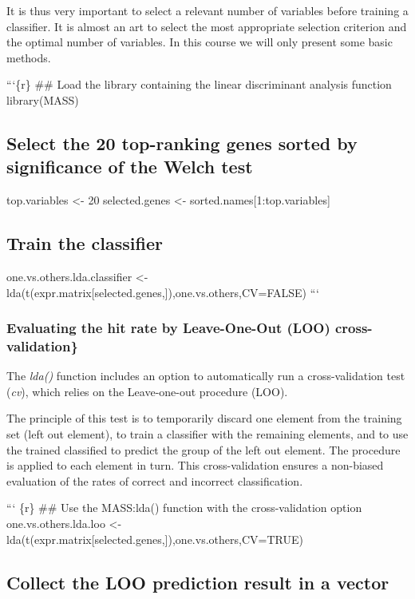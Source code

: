It is thus very important to select a relevant number of variables
before training a classifier. It is almost an art to select the most
appropriate selection criterion and the optimal number of variables. In
this course we will only present some basic methods.

```\{r\} \#\# Load the library containing the linear discriminant
analysis function library(MASS)

\subsection{Select the 20 top-ranking genes sorted by significance of
the Welch
test}\label{select-the-20-top-ranking-genes-sorted-by-significance-of-the-welch-test}

top.variables \textless{}- 20 selected.genes \textless{}-
sorted.names{[}1:top.variables{]}

\subsection{Train the classifier}\label{train-the-classifier}

one.vs.others.lda.classifier \textless{}-
lda(t(expr.matrix{[}selected.genes,{]}),one.vs.others,CV=FALSE) ```

\subsubsection{Evaluating the hit rate by Leave-One-Out (LOO)
cross-validation\}}\label{evaluating-the-hit-rate-by-leave-one-out-loo-cross-validation}

The \emph{lda()} function includes an option to automatically run a
cross-validation test (\emph{cv}), which relies on the {Leave-one-out}
procedure ({LOO}).

The principle of this test is to temporarily discard one element from
the training set ({left out} element), to train a classifier with the
remaining elements, and to use the trained classified to predict the
group of the left out element. The procedure is applied to each element
in turn. This cross-validation ensures a non-biased evaluation of the
rates of correct and incorrect classification.

``` \{r\} \#\# Use the MASS:lda() function with the cross-validation
option one.vs.others.lda.loo \textless{}-
lda(t(expr.matrix{[}selected.genes,{]}),one.vs.others,CV=TRUE)

\subsection{Collect the LOO prediction result in a
vector}\label{collect-the-loo-prediction-result-in-a-vector}

